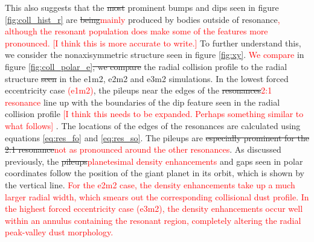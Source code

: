 \documentclass[twocolumn]{aastex63}
\newcommand{\ACBc}[1]{\textcolor{red}{#1}}
\begin{document}
This also suggests that the \sout{most} prominent bumps and dips seen in figure \ref{fig:coll_hist_r} are \sout{being}\ACBc{mainly} produced by bodies outside of resonance\ACBc{, although the resonant population does make some of the features more pronounced. [I think this is more accurate to write.]} To 
further understand this, we consider the nonaxisymmetric structure seen in figure \ref{fig:xy}. \ACBc{We compare} in figure \ref{fig:coll_polar_e}\sout{, we compare} the radial 
collision profile to the radial structure \sout{seen} in the e1m2, e2m2 and e3m2 simulations. In the lowest forced eccentricity case \ACBc{(e1m2)}, the pileups near the 
edges of the \sout{resonances}\ACBc{2:1 resonance} line up with the boundaries of the dip feature seen in the radial collision profile \ACBc{[I think this needs to be expanded.  Perhaps something similar to what follows] }. The locations of the edges of the 
resonances are calculated using equations \ref{eq:res_fo} and \ref{eq:res_so}. The pileups are \sout{especially prominent for the 2:1 resonance}\ACBc{not as pronounced around the other resonances}. As 
discussed previously, the \sout{pileups}\ACBc{planetesimal density enhancements} and gaps seen in polar coordinates follow the position of the giant planet in its orbit, which is shown by the vertical 
line. \ACBc{For the e2m2 case, the density enhancements take up a much larger radial width, which smears out the corresponding collisional dust profile.  In the highest forced eccentricity case (e3m2), the density enhancements occur well within an annulus containing the resonant region, completely altering the radial peak-valley dust morphology.}     
\end{document}

